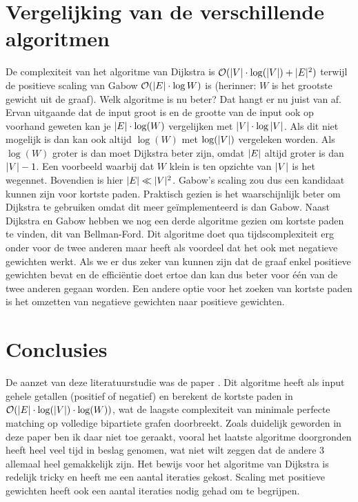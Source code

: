\documentclass[conference]{IEEEtran}
\theoremstyle{definition}
\DeclarePairedDelimiter{\card}{\vert}{\vert}  %
\begin{document}
\section{Vergelijking van de verschillende algoritmen}
De complexiteit van het algoritme van Dijkstra is $\mathcal{O}(\card{V} \cdot \log(\card{V}) + \card{E}^2)$ terwijl de positieve scaling van Gabow $\mathcal{O}(\card{E} \cdot \log{W})$ is (herinner: $W$ is het grootste gewicht uit de graaf). Welk algoritme is nu beter? Dat hangt er nu juist van af. Ervan uitgaande dat de input groot is en de grootte van de input ook op voorhand geweten kan je $\card{E} \cdot \log(W)$ vergelijken met $\card{V} \cdot \log{\card{V}}$. Als dit niet mogelijk is dan kan ook altijd $\log(W)$ met $\log(\card{V})$ vergeleken worden. Als $\log(W)$ groter is dan moet Dijkstra beter zijn, omdat $\card{E}$ altijd groter is dan $\card{V} - 1$. Een voorbeeld waarbij dat $W$ klein is ten opzichte van $\card{V}$ is het wegennet. Bovendien is hier $\card{E} \ll \card{V}^{2}$. Gabow's scaling zou dus een kandidaat kunnen zijn voor kortste paden. Praktisch gezien is het waarschijnlijk beter om Dijkstra te gebruiken omdat dit meer geïmplementeerd is dan Gabow. \cite{BGL}
Naast Dijkstra en Gabow hebben we nog een derde algoritme gezien om kortste paden te vinden, dit van Bellman-Ford. Dit algoritme doet qua tijdscomplexiteit erg onder voor de twee anderen maar heeft als voordeel dat het ook met negatieve gewichten werkt. Als we er dus zeker van kunnen zijn dat de graaf enkel positieve gewichten bevat en de efficiëntie doet ertoe dan kan dus beter voor één van de twee anderen gegaan worden. Een andere optie voor het zoeken van kortste paden is het omzetten van negatieve gewichten naar positieve gewichten.


\section*{Conclusies}
De aanzet van deze literatuurstudie was de paper  \cite{bernstein2023negativeweight}. Dit algoritme heeft als input gehele getallen (positief of negatief) en berekent de kortste paden in $\mathcal{O}(\card{E} \cdot \log(\card{V}) \cdot \log(W))$, wat de laagste complexiteit van minimale perfecte matching op volledige bipartiete grafen doorbreekt. Zoals duidelijk geworden in deze paper ben ik daar niet toe geraakt, vooral het laatste algoritme doorgronden heeft heel veel tijd in beslag genomen, wat niet wilt zeggen dat de andere 3 allemaal heel gemakkelijk zijn. Het bewijs voor het algoritme van Dijkstra is redelijk tricky en heeft me een aantal iteraties gekost. Scaling met positieve gewichten heeft ook een aantal iteraties nodig gehad om te begrijpen.
\end{document}
